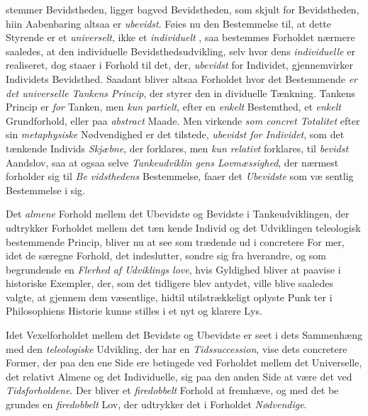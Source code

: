 stemmer Bevidstheden, ligger bagved Bevidstheden, som skjult
for Bevidstheden, hiin Aabenbaring altsaa er \emph{ubevidst}. Føies
nu den Bestemmelse til, at dette Styrende er et \emph{universelt},
ikke et \emph{individuelt} , saa bestemmes Forholdet nærmere
saaledes, at den individuelle Bevidsthedsudvikling, selv hvor
dens \emph{individuelle}  er realiseret, dog staaer i Forhold
til det, der, \emph{ubevidst} for Individet, gjennemvirker Individets
Bevidsthed. Saadant bliver altsaa Forholdet hvor det Bestemmende
\emph{er det universelle Tankens Princip}, der styrer den in\-%
dividuelle Tænkning. Tankens Princip er \emph{for} Tanken, men
\emph{kun partielt}, efter en \emph{enkelt} Bestemthed, et \emph{enkelt}
Grundforhold, eller paa \emph{abstract} Maade. Men virkende \emph{som
concret Totalitet} efter sin \emph{metaphysiske} Nødvendighed
er det tilstede, \emph{ubevidst for Individet}, som det tænkende
Individs \emph{Skjæbne}, der forklares, men \emph{kun relativt} forklares,
til \emph{bevidst} Aandslov, saa at ogsaa selve \emph{Tankeudviklin\-%
gens Lovmæssighed}, der nærmest forholder sig til \emph{Be\-%
vidsthedens} Bestemmelse, faaer det \emph{Ubevidste} som væ\-%
sentlig Bestemmelse i sig.

Det \emph{almene} Forhold mellem det Ubevidste og Bevidste
i Tankeudviklingen, der udtrykker Forholdet mellem det tæn\-%
kende Individ og det Udviklingen teleologisk bestemmende
Princip, bliver nu at see som trædende ud i concretere For\-%
mer, idet de særegne Forhold, det indeslutter, sondre sig fra
hverandre, og som begrundende en \emph{Flerhed af Udviklings\-%
love}, hvis Gyldighed bliver at paavise i historiske Exempler,
der, som det tidligere blev antydet, ville blive saaledes valgte,
at gjennem dem væsentlige, hidtil utilstrækkeligt oplyste Punk\-%
ter i Philosophiens Historie kunne stilles i et nyt og klarere
Lys.

Idet Vexelforholdet mellem det Bevidste og Ubevidste er
seet i dets Sammenhæng med den \emph{teleologiske} Udvikling,
der har en \emph{Tidssuccession}, vise dets concretere Former,
der paa den ene Side ere betingede ved Forholdet mellem det
 Universelle, det relativt Almene og det Individuelle, sig paa
den anden Side at være det ved \emph{Tidsforholdene}. Der
bliver et \emph{firedobbelt} Forhold at fremhæve, og med det be\-%
grundes en \emph{firedobbelt} Lov, der udtrykker det i Forholdet
\emph{Nødvendige}.

